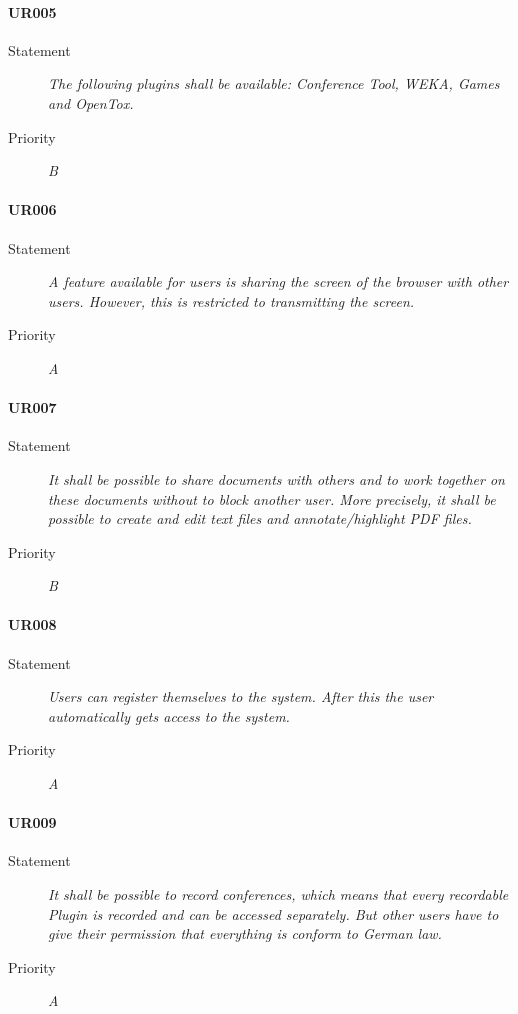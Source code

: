 \paragraph{UR005}
\begin{description}
\item[Statement] \textit{The following plugins shall be available: Conference
    Tool, WEKA, Games and OpenTox.}
\item[Priority] \textit{B}
\end{description}

\paragraph{UR006}
\begin{description}
\item[Statement] \textit{A feature available for users is sharing the screen
    of the browser with other users. However, this is restricted to
    transmitting the screen.}
\item[Priority] \textit{A}
\end{description}

\paragraph{UR007}
\begin{description}
\item[Statement] \textit{It shall be possible to share documents with
    others and to work together on these documents without to block another
    user. More precisely, it shall be possible to create and edit text files
    and annotate/highlight PDF files.}
\item[Priority] \textit{B}
\end{description}

\paragraph{UR008}
\begin{description}
\item[Statement] \textit{Users can register themselves to the system. After this
    the user automatically gets access to the system.}
\item[Priority] \textit{A}
\end{description}

\paragraph{UR009}
\begin{description}
\item[Statement] \textit{It shall be possible to record conferences, which
    means that every recordable Plugin is recorded and can be accessed
    separately. But other users have to give their permission that everything
    is conform to German law.}
\item[Priority] \textit{A}
\end{description}

